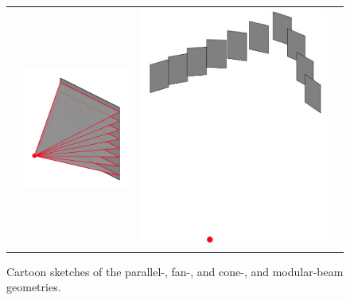 \documentclass[11pt]{article}
\begin{document}
\begin{figure}[h]
\begin{tabular}{cccc}
& \includegraphics[scale=0.28]{coneBeam}
& \includegraphics[scale=0.2]{modularBeam_cartoon}
\end{tabular}
\caption{Cartoon sketches of the parallel-, fan-, and cone-, and modular-beam geometries.} \label{fig:geometrySketches}
\end{figure}
\end{document}
